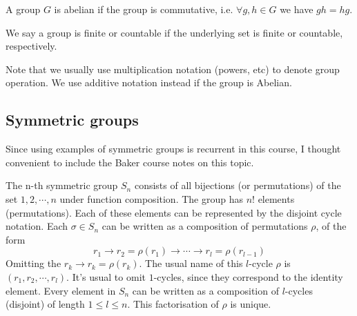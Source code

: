 \begin{definition}
  A group $G$ is abelian if the group is commutative, i.e. $\forall g,h\in G$ we have
  $gh=hg$.
  \label{abelianGroup}
\end{definition}

\begin{definition}
  We say a group is finite or countable if the underlying set is finite or countable,
  respectively.
\end{definition}
Note that we usually use multiplication notation (powers, etc) to denote group operation.
We use additive notation instead if the group is Abelian.

\subsection{Symmetric groups}
Since using examples of symmetric groups is recurrent in this course, I thought convenient
to include the Baker course notes on this topic. 

The n-th symmetric group $S_n$ consists of all bijections (or permutations) of the set
${1,2,\cdots , n}$ under function composition. The group has $n!$ elements (permutations).
Each of these elements can be represented by the disjoint cycle notation. Each $\sigma\in
S_n$ can be written as a composition of permutations $\rho$, of the form
\[r_1\to r_2=\rho(r_1) \to \cdots \to r_l=\rho(r_{l-1})\]
Omitting the $r_k\to r_k=\rho(r_k)$. The usual name of this $l$-cycle $\rho$ is
$(r_1, r_2, \cdots, r_l)$. It's usual to omit $1$-cycles, since they correspond to the
identity element. Every element in $S_n$ can be written as a composition of $l$-cycles
(disjoint) of length $1\leq l \leq n$. This factorisation of $\rho$ is unique.

